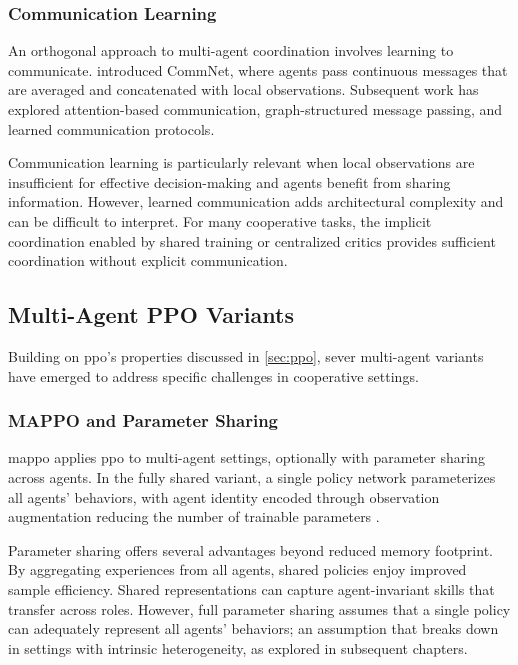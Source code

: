 
\subsubsection{Communication Learning}

An orthogonal approach to multi-agent coordination involves learning to communicate. 
\cite{sukhbaatar2016} introduced CommNet, where agents pass continuous messages 
that are averaged and concatenated with local observations. 
Subsequent work has explored attention-based communication, 
graph-structured message passing, and learned communication protocols.

Communication learning is particularly relevant when local 
observations are insufficient for effective decision-making 
and agents benefit from sharing information. 
However, learned communication adds architectural complexity 
and can be difficult to interpret. For many cooperative tasks, 
the implicit coordination enabled by shared training or 
centralized critics provides sufficient coordination without
explicit communication.

\subsection{Multi-Agent PPO Variants}
\label{subsec:mappo-variants}

Building on \gls{ppo}'s properties discussed in \cref{sec:ppo},
sever multi-agent variants have emerged to address specific 
challenges in cooperative settings.

\subsubsection{MAPPO and Parameter Sharing}

\Gls{mappo} applies \gls{ppo} to multi-agent settings, 
optionally with parameter sharing across agents. 
In the fully shared variant, a single policy network 
parameterizes all agents' behaviors, with agent 
identity encoded through observation augmentation
reducing the number of trainable parameters \cite{yu2022}.

Parameter sharing offers several advantages beyond reduced memory footprint. 
By aggregating experiences from all agents, shared policies enjoy improved 
sample efficiency. Shared representations can capture agent-invariant 
skills that transfer across roles. 
However, full parameter sharing assumes that a single policy can 
adequately represent all agents' behaviors;
an assumption that breaks down in settings with intrinsic heterogeneity, 
as explored in subsequent chapters.

